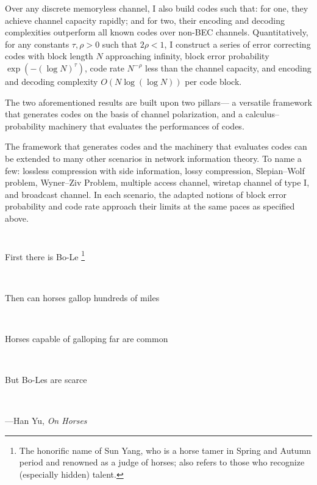 \documentclass[openany]{amsbook}
\numberwithin{equation}{chapter}
\numberwithin{figure}{chapter}
\numberwithin{table}{chapter}
\def\glet{\global\let}
\theoremstyle{definition}	理dfn:Definition~?s			理exa:Example~?s
\theoremstyle{remark}		理cla:Claim~?s				理rem:Remark~?s
\begin{document}
	Over any discrete memoryless channel, I also build codes such that:
	for one, they achieve channel capacity rapidly;
	and for two, their encoding and decoding complexities
	outperform all known codes over non-BEC channels.
	Quantitatively, for any constants $\tau,\rho>0$ such that $2\rho<1$,
	I construct a series of error correcting codes with
	block length $N$ approaching infinity,
	block error probability $\exp(-(\log N)^\tau)$,
	code rate $N^{-\rho}$ less than the channel capacity,
	and encoding and decoding complexity $O(N\log(\log N))$ per code block.
	
	The two aforementioned results are built upon two pillars---%
	a versatile framework that generates codes on the basis of channel polarization,
	and a calculus--probability machinery that evaluates the performances of codes.
	
	The framework that generates codes and the machinery that evaluates codes
	can be extended to many other scenarios in network information theory.
	To name a few:
	lossless compression with side information,
	lossy compression,
	Slepian--Wolf problem,
	Wyner--Ziv Problem,
	multiple access channel,
	wiretap channel of type I,
	and broadcast channel.
	In each scenario, the adapted notions of block error probability and code rate
	approach their limits at the same paces as specified above.



\gobblefive%
\chapter*{}

	First there is Bo-Le%
	\footnote{
		The honorific name of Sun Yang, who is a horse tamer
		in Spring and Autumn period and renowned as a judge of horses;
		also refers to those who recognize (especially hidden) talent.
	}
	
	~
	
	Then can horses gallop hundreds of miles
	
	~
	
	Horses capable of galloping far are common
	
	~
	
	But Bo-Les are scarce
	
	~
	
	\hbox{}\hfill---Han Yu, \emph{On Horses}



\let\hold\hfil\let\cold\l@chapter\def\l@chapter{\def\hfil{\dotfill\glet\hfil\hold}\cold}
\tableofcontents
\end{document}
